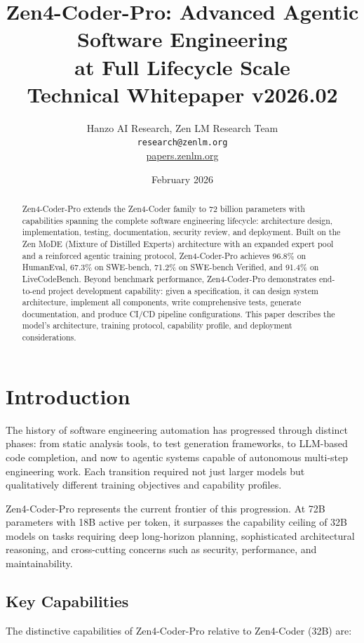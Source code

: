 \documentclass[11pt,a4paper]{article}
\title{\textbf{Zen4-Coder-Pro: Advanced Agentic Software Engineering\\
at Full Lifecycle Scale}\\[0.5em]
\large Technical Whitepaper v2026.02}
\author{Hanzo AI Research, Zen LM Research Team\\
\texttt{research@zenlm.org}\\
\href{https://papers.zenlm.org}{papers.zenlm.org}}
\date{February 2026}
\begin{document}
\maketitle

\begin{abstract}
Zen4-Coder-Pro extends the Zen4-Coder family to 72 billion parameters with capabilities spanning the complete software engineering lifecycle: architecture design, implementation, testing, documentation, security review, and deployment. Built on the Zen MoDE (Mixture of Distilled Experts) architecture with an expanded expert pool and a reinforced agentic training protocol, Zen4-Coder-Pro achieves 96.8\% on HumanEval, 67.3\% on SWE-bench, 71.2\% on SWE-bench Verified, and 91.4\% on LiveCodeBench. Beyond benchmark performance, Zen4-Coder-Pro demonstrates end-to-end project development capability: given a specification, it can design system architecture, implement all components, write comprehensive tests, generate documentation, and produce CI/CD pipeline configurations. This paper describes the model's architecture, training protocol, capability profile, and deployment considerations.
\end{abstract}

\tableofcontents
\newpage

\section{Introduction}

The history of software engineering automation has progressed through distinct phases: from static analysis tools, to test generation frameworks, to LLM-based code completion, and now to agentic systems capable of autonomous multi-step engineering work. Each transition required not just larger models but qualitatively different training objectives and capability profiles.

Zen4-Coder-Pro represents the current frontier of this progression. At 72B parameters with 18B active per token, it surpasses the capability ceiling of 32B models on tasks requiring deep long-horizon planning, sophisticated architectural reasoning, and cross-cutting concerns such as security, performance, and maintainability.

\subsection{Key Capabilities}

The distinctive capabilities of Zen4-Coder-Pro relative to Zen4-Coder (32B) are:
\end{document}
